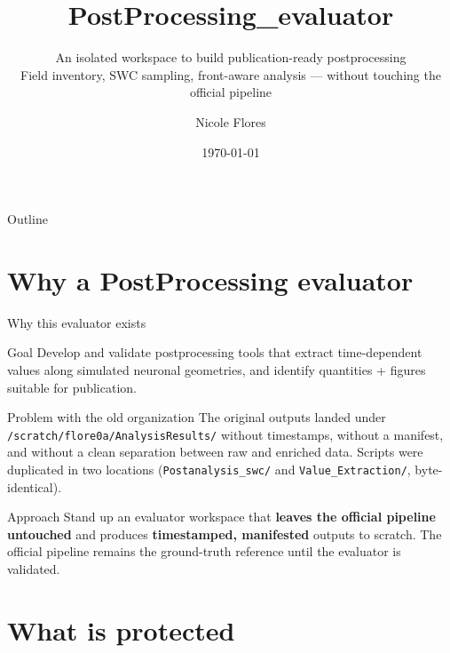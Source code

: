 \documentclass[aspectratio=169]{beamer}
\title[PostProcessing\_evaluator]{PostProcessing\_evaluator}
\subtitle{An isolated workspace to build publication-ready postprocessing\\\small{Field inventory, SWC sampling, front-aware analysis --- without touching the official pipeline}}
\author{Nicole Flores}
\institute{KAUST}
\date{\today}
\begin{document}
\frame{\titlepage}

\begin{frame}{Outline}
\tableofcontents
\end{frame}

\section{Why a PostProcessing evaluator}

\begin{frame}{Why this evaluator exists}
\begin{block}{Goal}
Develop and validate postprocessing tools that extract time-dependent values
along simulated neuronal geometries, and identify quantities + figures
suitable for publication.
\end{block}

\begin{alertblock}{Problem with the old organization}
The original outputs landed under \texttt{/scratch/flore0a/AnalysisResults/}
without timestamps, without a manifest, and without a clean separation
between raw and enriched data. Scripts were duplicated in two locations
(\texttt{Postanalysis\_swc/} and \texttt{Value\_Extraction/}, byte-identical).
\end{alertblock}

\begin{block}{Approach}
Stand up an evaluator workspace that \textbf{leaves the official pipeline
untouched} and produces \textbf{timestamped, manifested} outputs to scratch.
The official pipeline remains the ground-truth reference until the evaluator
is validated.
\end{block}
\end{frame}

\section{What is protected}
\end{document}

